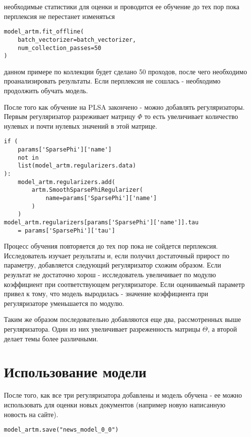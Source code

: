  необходимые статистики для оценки и проводится ее обучение до тех пор пока перплексия не перестанет изменяться

\begin{lstlisting}
model_artm.fit_offline(
    batch_vectorizer=batch_vectorizer, 
    num_collection_passes=50
)
\end{lstlisting}

 данном примере по коллекции будет сделано 50 проходов, после чего необходимо проанализировать результаты. Если перплексия не сошлась - необходимо продолжить обучать модель.

После того как обучение на PLSA закончено - можно добавлять регуляризаторы. Первым регуляризатор разреживает матрицу $\Phi$ то есть увеличивает количество нулевых и почти нулевых значений в этой матрице.

\begin{lstlisting}
if (
    params['SparsePhi']['name'] 
    not in 
    list(model_artm.regularizers.data)
):
    model_artm.regularizers.add(
        artm.SmoothSparsePhiRegularizer(
            name=params['SparsePhi']['name']
        )
    )
model_artm.regularizers[params['SparsePhi']['name']].tau 
    = params['SparsePhi']['tau']
\end{lstlisting}

Процесс обучения повторяется до тех пор пока не сойдется перплексия. Исследователь изучает результаты и, если получил достаточный прирост по параметру, добавляется следующий регуляризатор схожим образом. Если результат не достаточно хорош - исследователь увеличивает по модулю коэффициент при соответствующем регуляризаторе. Если оцениваемый параметр привел к тому, что модель выродилась - значение коэффициента при регуляризаторе уменьшается по модулю.

Таким же образом последовательно добавляются еще два, рассмотренных выше регуляризатора. Один из них увеличивает разреженность матрицы $\Theta$, а второй делает темы более различными.

\section{Использование модели}

После того, как все три регуляризатора добавлены и модель обучена - ее можно использовать для оценки новых документов (например новую написанную новость на сайте).

\begin{lstlisting}
model_artm.save("news_model_0_0")
\end{lstlisting}

